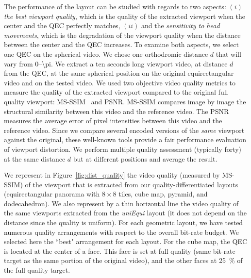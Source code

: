 The performance of the layout can be studied with
regards to two aspects: $(i)$ \emph{the best viewport quality}, which
is the quality of the extracted viewport when the \FoV{} center and
the \ac{QEC} perfectly matches, $(ii)$ and the \emph{sensitivity to
head movements}, which is the degradation of the viewport quality when
the distance between the \FoV{} center and the \ac{QEC} increases.
To examine both aspects, we select one \ac{QEC} on the spherical video.
We chose one orthodromic distance $d$ that will vary from \numrange{0}{\pi}.
We extract a ten seconds long viewport video, at distance $d$
from the \ac{QEC}, at the same spherical position on the original
equirectangular video and on the tested video. We used two objective
video quality metrics to measure the quality of the extracted viewport
compared to the original full quality viewport:
\ac{MS-SSIM}~\cite{wang2003multiscale} and
\ac{PSNR}.
\ac{MS-SSIM} compares image by image the structural
similarity between this video and the reference video. The \ac{PSNR} measures the average error of pixel intensities
between this video and the reference video. Since we
compare several encoded versions of the \emph{same} viewport against the
original, these well-known tools provide a fair performance evaluation of viewport distortion.
We perform multiple quality assessment (typically forty) at the same distance $d$ but at different positions and average the result.





We represent in Figure~\ref{fig:dist_quality} the video quality
(measured by \acs{MS-SSIM}) of the viewport that is extracted from our
quality-differentiated layouts (equirectangular panorama with
$8\!\times\! 8$ tiles, cube map, pyramid, and dodecahedron). We also
represent by a thin horizontal line the video quality of the same
viewports extracted from the \textit{uniEqui} layout (it does
not depend on the distance since the quality is uniform). For each
geometric layout, we have tested numerous quality arrangements with
respect to the overall bit-rate budget. We selected here the ``best"
arrangement for each layout. For the cube map,
the
\ac{QEC} is located at the center of a face. This face is set at full
quality (same bit-rate target as the same portion of the original
video), and the other faces at \SI{25}{\percent} of the
full quality target.

